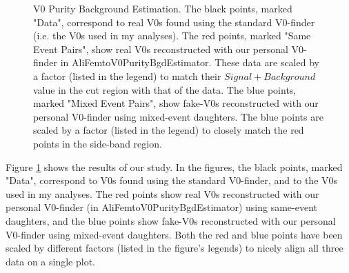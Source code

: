 \documentclass[../AnalysisNoteJBuxton.tex]{subfiles}
\begin{document}
\begin{figure}[h!]
  \centering
  \caption[V0 Purity Background Estimation]{V0 Purity Background Estimation.  The black points, marked "Data", correspond to real V0s found using the standard V0-finder (i.e. the V0s used in my analyses).  The red points, marked "Same Event Pairs", show real V0s reconstructed with our personal V0-finder in AliFemtoV0PurityBgdEstimator.  These data are scaled by a factor (listed in the legend) to match their $Signal+Background$ value in the cut region with that of the data.  The blue points, marked "Mixed Event Pairs", show fake-V0s reconstructed with our personal V0-finder using mixed-event daughters.  The blue points are scaled by a factor (listed in the legend) to closely match the red points in the side-band region.}
  \label{fig:V0PurBgdEst}
\end{figure}

Figure \ref{fig:V0PurBgdEst} shows the results of our study.  In the figures, the black points, marked "Data", correspond to V0s found using the standard V0-finder, and to the V0s used in my analyses.  The red points show real V0s reconstructed with our personal V0-finder (in AliFemtoV0PurityBgdEstimator) using same-event daughters, and the blue points show fake-V0s reconstructed with our personal V0-finder using mixed-event daughters.  Both the red and blue points have been scaled by different factors (listed in the figure's legends) to nicely align all three data on a single plot.
\end{document}
